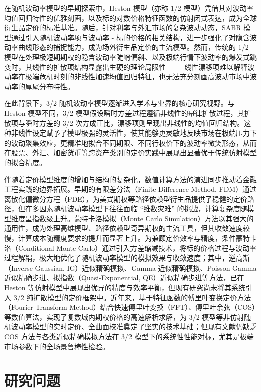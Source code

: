 在随机波动率模型的早期探索中，Heston 模型（亦称 1/2 模型）凭借其对波动率均值回归特性的优雅刻画，以及标的对数价格特征函数的仿射闭式表达，成为全球衍生品定价的标准基准。随后，针对利率与外汇市场的复杂波动动态，SABR 模型通过引入随机波动率项与波动率 - 标的价格的相关结构，进一步强化了对隐含波动率曲线形态的捕捉能力，成为场外衍生品定价的主流模型。然而，传统的 1/2 模型在处理极短期期权的隐含波动率陡峭偏斜、以及极端行情下波动率的爆发式跳变时，其线性的扩散项结构显露出生硬的理论局限性 —— 线性漂移项难以解释波动率在极端危机时刻的非线性加速均值回归特征，也无法充分刻画高波动市场中波动率的厚尾分布特性。

在此背景下，3/2 随机波动率模型逐渐进入学术与业界的核心研究视野。与 Heston 模型不同，3/2 模型假设瞬时方差过程遵循非线性的幂律扩散过程，其扩散项与瞬时方差的 3/2 次方成正比，漂移项则呈现出非线性的均值回归结构。这种非线性设定赋予了模型极强的灵活性，使其能够更灵敏地反映市场在极端压力下的波动聚集效应，更精准地拟合不同期限、不同行权价下的波动率微笑形态，从而在股票、外汇、加密货币等跨资产类别的定价实践中展现出显著优于传统仿射模型的拟合精度。

伴随着定价模型维度的增加与结构的复杂化，数值计算方法的演进同步推动着金融工程实践的边界拓展。早期的有限差分法（Finite Difference Method, FDM）通过离散化偏微分方程（PDE），为美式期权等路径依赖型衍生品提供了稳健的定价路径，但在多因素随机波动率模型下往往面临 “维数灾难” 的挑战，计算复杂度随模型维度呈指数级上升。蒙特卡洛模拟（Monte Carlo Simulation）方法以其强大的通用性，成为处理高维模型、路径依赖型奇异期权的主流工具，但其收敛速度较慢，计算成本随精度要求的提升而显著上升。为兼顾定价效率与精度，条件蒙特卡洛（Conditional Monte Carlo）通过引入方差缩减技术，将标的价格过程与波动率过程解耦，极大地优化了随机波动率模型的模拟效果与收敛速度；其中，逆高斯（Inverse Gaussian, IG）近似精确模拟、Gamma 近似精确模拟、Poisson-Gamma 近似精确步进、拟指数（Quasi-Exponential, QE）近似精确步进等方法，已在 Heston 等仿射模型中展现出优异的精度与效率平衡，但现有研究尚未将其系统引入 3/2 纯扩散模型的定价框架中。近年来，基于特征函数的傅里叶变换定价方法（Fourier Transform Method）结合快速傅里叶变换（FFT）、傅里叶余弦（COS）等数值算法，实现了复数域内期权价格的高速解析求解，为 3/2 模型等非仿射随机波动率模型的实时定价、全曲面校准奠定了坚实的技术基础；但现有文献仍缺乏 COS 方法与各类近似精确模拟方法在 3/2 模型下的系统性性能对标，尤其是极端市场参数下的全场景鲁棒性检验。

\section{研究问题}


